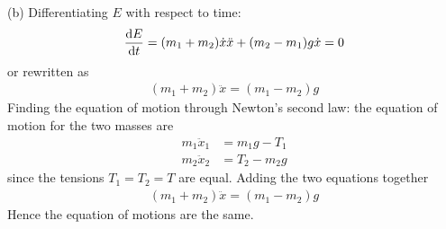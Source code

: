 \documentclass[../problems.tex]{subfiles}
\begin{document}
(b) Differentiating $E$ with respect to time:
\begin{align*}
    \dv{E}{t} = (m_1 + m_2) \dot{x} \ddot{x} + (m_2 - m_1) g \dot{x} = 0
\end{align*}
or rewritten as
\begin{align*}
    (m_1 + m_2) \ddot{x} = (m_1 - m_2) g
\end{align*}
Finding the equation of motion through Newton's second law: the equation of motion for the two
masses are
\begin{align*}
    m_1 \ddot{x}_1 &= m_1 g - T_1 \\
    m_2 \ddot{x}_2 &= T_2 - m_2 g 
\end{align*}
since the tensions $T_1 = T_2 = T$ are equal. Adding the two equations together
\begin{align*}
    (m_1 + m_2) \ddot{x} = (m_1 - m_2) g
\end{align*}
Hence the equation of motions are the same.
\end{document}
